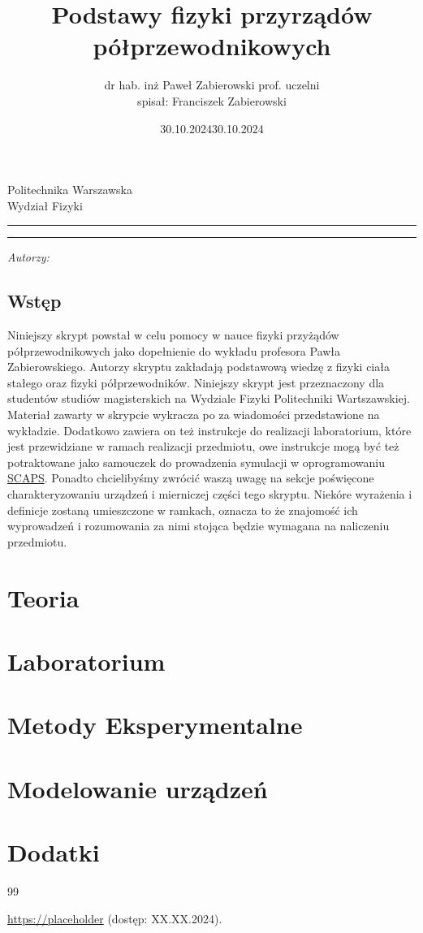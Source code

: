 \documentclass[14pt,a4paper]{report}
\date{30.10.2024}
\author{dr hab. inż Paweł Zabierowski prof. uczelni\\
spisał: Franciszek Zabierowski }
\title{Podstawy fizyki przyrządów półprzewodnikowych}
\makeatletter
\newcommand{\linia}{\rule{\linewidth}{0.4mm}}
\renewcommand{\maketitle}{\begin{titlepage}
    \vspace*{1cm}
    \begin{center}\small
        Politechnika Warszawska\\
        Wydział Fizyki\\
    \end{center}
    \vspace{3cm}
    \noindent\linia
    \begin{center}
        \LARGE \textsc{\@title}
    \end{center}
    \linia
    \vspace{0.5cm}
    \begin{flushright}
        \begin{minipage}{10cm}
            \textit{\small Autorzy:}\\
            \normalsize \textsc{\@author} \par
        \end{minipage}
        
        
        \vspace*{\stretch{15}}
        \begin{center}
            \date{30.10.2024}
        \end{center}
    \end{flushright}
\end{titlepage}%
}
\makeatother
\begin{document}
\maketitle


\chapter*{Wstęp}
Niniejszy skrypt powstał w celu pomocy w nauce fizyki przyżądów półprzewodnikowych
jako dopełnienie do wykładu profesora Pawła Zabierowskiego. Autorzy skryptu zakładają podstawową 
wiedzę z fizyki ciała stałego oraz fizyki półprzewodników. Niniejszy skrypt jest przeznaczony dla studentów 
studiów magisterskich na Wydziale Fizyki Politechniki Wartszawskiej. Materiał zawarty w skrypcie wykracza 
po za wiadomości przedstawione na wykładzie. Dodatkowo zawiera on też instrukcje do realizacji laboratorium, 
które jest przewidziane w ramach realizacji przedmiotu, owe instrukcje mogą być też potraktowane jako samouczek do 
prowadzenia symulacji w oprogramowaniu \hyperlink{https://scaps.elis.ugent.be}{SCAPS}. Ponadto chcielibyśmy zwrócić 
waszą uwagę na sekcje poświęcone charakteryzowaniu urządzeń i mierniczej części tego skryptu. Niekóre wyrażenia i definicje zostaną 
umieszczone w ramkach, oznacza to że znajomość ich wyprowadzeń i rozumowania za nimi stojąca będzie wymagana na naliczeniu przedmiotu. 


\tableofcontents
\part{Teoria}



\part{Laboratorium }
\part{Metody Eksperymentalne}

\part{Modelowanie urządzeń}

\part{Dodatki}
\appendix 

\begin{thebibliography}{99}

\url{https://placeholder}
(dostęp: XX.XX.2024).

\end{thebibliography}
\end{document}
